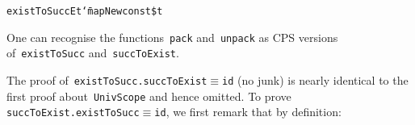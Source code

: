 \documentclass[9pt,authoryear]{sigplanconf}
\begin{document}
{{}\vphantom{$\{$}}\texttt{existToSucc}\texttt{\mbox{\hspace{0.50em}}}\texttt{\makebox[1.22ex][l]{$ {(} $}}\texttt{E}\texttt{\mbox{\hspace{0.50em}}}\texttt{\makebox[1.22ex][c]{\_{}}}\texttt{\mbox{\hspace{0.50em}}}\texttt{t}\texttt{\makebox[1.22ex][r]{$ {)} $}}\texttt{\mbox{\hspace{0.50em}}}\texttt{{\char `\=}}\texttt{\mbox{\hspace{0.50em}}}\texttt{mapNew}\texttt{\mbox{\hspace{0.50em}}}\texttt{\makebox[1.22ex][l]{$ {(} $}}\texttt{const}\texttt{\mbox{\hspace{0.50em}}}\texttt{\makebox[1.22ex][l]{$ {(} $}}\texttt{\makebox[1.22ex][r]{$ {)} $}}\texttt{\makebox[1.22ex][r]{$ {)} $}}\texttt{\mbox{\hspace{0.50em}}}\texttt{\makebox[1.22ex][c]{\textless{}}\${}\makebox[1.22ex][c]{\textgreater{}}}\texttt{\mbox{\hspace{0.50em}}}\texttt{t}\texttt{{\nopagebreak \newline%
}\vphantom{$\{$}}%


%
One can recognise the functions{~}\texttt{pack} and{~}\texttt{unpack} as CPS
    versions of{~}\texttt{existToSucc} and{~}\texttt{succToExist}.%


%
The proof of{~}\texttt{existToSucc}\texttt{\mbox{\hspace{0.50em}}}\texttt{.}\texttt{\mbox{\hspace{0.50em}}}\texttt{succToExist}\texttt{\mbox{\hspace{0.50em}}}\texttt{$ \equiv $}\texttt{\mbox{\hspace{0.50em}}}\texttt{id} (no junk) is nearly
    identical to the first proof about{~}\texttt{UnivScope} and hence omitted.
    To prove \texttt{succToExist}\texttt{\mbox{\hspace{0.50em}}}\texttt{.}\texttt{\mbox{\hspace{0.50em}}}\texttt{existToSucc}\texttt{\mbox{\hspace{0.50em}}}\texttt{$ \equiv $}\texttt{\mbox{\hspace{0.50em}}}\texttt{id}, we first remark that by
    definition{:}%


%
%


{\nopagebreak }
\end{document}
